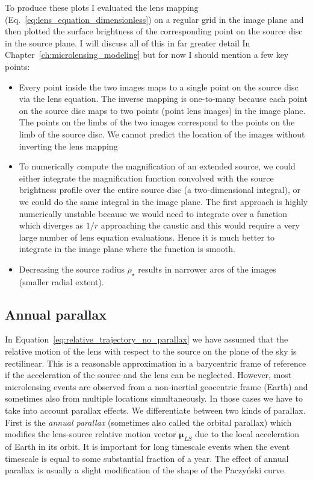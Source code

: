 \documentclass[12pt,dvipsnames]{report}
\begin{document}
To produce these plots I evaluated the lens mapping
(Eq.~\ref{eq:lens_equation_dimensionless}) on a regular grid in the image plane
and then plotted the surface brightness of the corresponding point on the
source disc in the source plane. I will discuss all of this in far greater
detail In Chapter~\ref{ch:microlensing_modeling} but for now I should mention a
few key points:
\begin{itemize}
    \item Every point inside the two images maps to a single point on the source disc via
          the lens equation. The inverse mapping is one-to-many because each point on the
          source disc maps to two points (point lens images) in the image plane. The
          points on the limbs of the two images correspond to the points on the limb of
          the source disc. We cannot predict the location of the images without inverting
          the lens mapping
    \item To numerically compute the magnification of an extended source, we could either
          integrate the magnification function convolved with the source brightness
          profile over the entire source disc (a two-dimensional integral), or we could
          do the same integral in the image plane. The first approach is highly
          numerically unstable because we would need to integrate over a function which
          diverges as $1/r$ approaching the caustic and this would require a very large
          number of lens equation evaluations. Hence it is much better to integrate in
          the image plane where the function is smooth.
    \item Decreasing the source radius $\rho_\star$ results in narrower arcs of the
          images (smaller radial extent).
\end{itemize}

\subsection{Annual parallax}
\label{ssec:single_lens_parallax}
In Equation~\ref{eq:relative_trajectory_no_parallax} we have assumed that the
relative motion of the lens with respect to the source on the plane of the sky
is rectilinear.
This is a reasonable approximation in a barycentric frame of
reference if the acceleration of the source and the lens can be neglected.
However, most microlensing events are observed from a non-inertial geocentric
frame (Earth) and sometimes also from multiple locations simultaneously. In those
cases we have to take into account parallax effects.
We differentiate between two kinds of parallax. First is the \emph{annual
    parallax} (sometimes also called the orbital parallax) which modifies the
lens-source relative motion vector $\boldsymbol\mu_{LS}$ due to the local
acceleration of Earth in its orbit. It is important for long timescale events
when the event timescale is equal to some substantial fraction of a year. The
effect of annual parallax is usually a slight modification of the shape of the
Paczy\'nski curve.
\end{document}
